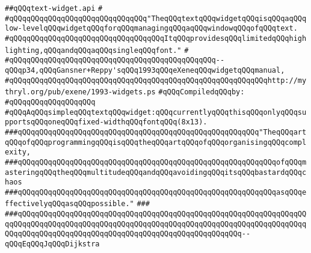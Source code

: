 \label{src/lib/x-kit/widget/old/text/text-widget.api}
\verb|##qQQqtext-widget.api|\newline
\verb|#|\newline
\verb|#qQQqqQQqqQQqqQQqqQQqqQQqqQQqqQQq"TheqQQqtextqQQqwidgetqQQqisqQQqaqQQqlow-levelqQQqwidgetqQQqforqQQqmanagingqQQqaqQQqwindowqQQqofqQQqtext.|\newline
\verb|#qQQqqQQqqQQqqQQqqQQqqQQqqQQqqQQqqQQqItqQQqprovidesqQQqlimitedqQQqhighlighting,qQQqandqQQqaqQQqsingleqQQqfont."|\newline
\verb|#|\newline
\verb|#qQQqqQQqqQQqqQQqqQQqqQQqqQQqqQQqqQQqqQQqqQQqqQQq--qQQqp34,qQQqGansner+Reppy'sqQQq1993qQQqeXeneqQQqwidgetqQQqmanual,|\newline
\verb|#qQQqqQQqqQQqqQQqqQQqqQQqqQQqqQQqqQQqqQQqqQQqqQQqqQQqqQQqqQQqhttp://mythryl.org/pub/exene/1993-widgets.ps|\newline
\newline
\verb|#qQQqCompiledqQQqby:|\newline
\verb|#qQQqqQQqqQQqqQQqqQQq|\newline
\newline
\newline
\verb|#qQQqAqQQqsimpleqQQqtextqQQqwidget:qQQqcurrentlyqQQqthisqQQqonlyqQQqsupportsqQQqoneqQQqfixed-widthqQQqfontqQQq(8x13).|\newline
\newline
\newline
\newline
\verb|###qQQqqQQqqQQqqQQqqQQqqQQqqQQqqQQqqQQqqQQqqQQqqQQqqQQqqQQq"TheqQQqartqQQqofqQQqprogrammingqQQqisqQQqtheqQQqartqQQqofqQQqorganisingqQQqcomplexity,|\newline
\verb|###qQQqqQQqqQQqqQQqqQQqqQQqqQQqqQQqqQQqqQQqqQQqqQQqqQQqqQQqqQQqofqQQqmasteringqQQqtheqQQqmultitudeqQQqandqQQqavoidingqQQqitsqQQqbastardqQQqchaos|\newline
\verb|###qQQqqQQqqQQqqQQqqQQqqQQqqQQqqQQqqQQqqQQqqQQqqQQqqQQqqQQqqQQqasqQQqeffectivelyqQQqasqQQqpossible."|\newline
\verb|###|\newline
\verb|###qQQqqQQqqQQqqQQqqQQqqQQqqQQqqQQqqQQqqQQqqQQqqQQqqQQqqQQqqQQqqQQqqQQqqQQqqQQqqQQqqQQqqQQqqQQqqQQqqQQqqQQqqQQqqQQqqQQqqQQqqQQqqQQqqQQqqQQqqQQqqQQqqQQqqQQqqQQqqQQqqQQqqQQqqQQqqQQqqQQqqQQqqQQqqQQq--qQQqEqQQqJqQQqDijkstra|\newline
\newline
\newline
